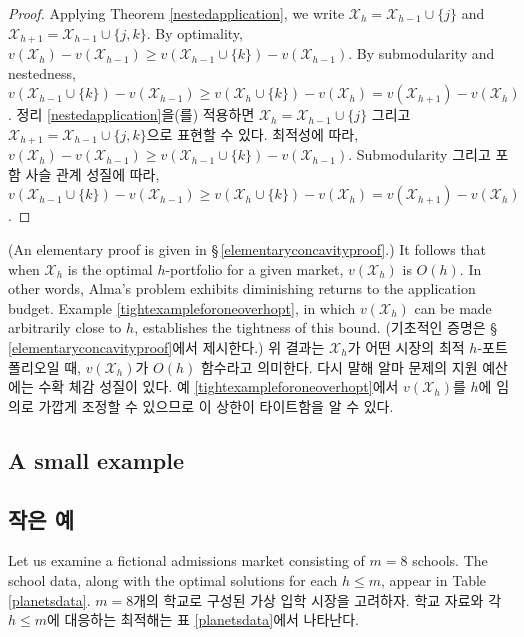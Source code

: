 \documentclass[11pt]{article} %
\theoremstyle{definition}
\newtheorem{example}{Example}
\theoremstyle{definition}
\newtheorem{example}{예}
\begin{document}
\begin{proof}
\ifen Applying Theorem \ref{nestedapplication}, we write $\mathcal{X}_h = \mathcal{X}_{h-1} \cup\{j\}$ and $\mathcal{X}_{h+1} = \mathcal{X}_{h-1} \cup\{j, k\}$. By optimality, $v(\mathcal{X}_h) - v(\mathcal{X}_{h-1}) \geq v(\mathcal{X}_{h-1}\cup\{k\}) - v(\mathcal{X}_{h-1})$. By submodularity and nestedness, $v(\mathcal{X}_{h-1}\cup\{k\}) - v(\mathcal{X}_{h-1}) \geq  v(\mathcal{X}_{h}\cup\{k\}) - v(\mathcal{X}_{h}) = v(\mathcal{X}_{h+1}) - v(\mathcal{X}_{h})$.
\else 정리 \ref{nestedapplication}을(를) 적용하면 $ \mathcal{X}_h = \mathcal{X}_{h-1} \cup\{j\}$ 그리고 $\mathcal{X}_{h+1} = \mathcal{X}_{h-1} \cup\{j, k\}$으로 표현할 수 있다. 최적성에 따라, $v(\mathcal{X}_h) - v(\mathcal{X}_{h-1}) \geq v(\mathcal{X}_{h-1}\cup\{k\}) - v(\mathcal{X}_{h-1})$. Submodularity 그리고 포함 사슬 관계 성질에 따라, $v(\mathcal{X}_{h-1}\cup\{k\}) - v(\mathcal{X}_{h-1}) \geq  v(\mathcal{X}_{h}\cup\{k\}) - v(\mathcal{X}_{h}) = v(\mathcal{X}_{h+1}) - v(\mathcal{X}_{h})$. \fi
\end{proof}
\ifen
\noindent (An elementary proof is given in \S\,\ref{elementaryconcavityproof}.) It follows that when $\mathcal{X}_h$ is the optimal $h$-portfolio for a given market, $v(\mathcal{X}_h)$ is $O(h)$. In other words, Alma's problem exhibits diminishing returns to the application budget. Example \ref{tightexampleforoneoverhopt}, in which $v(\mathcal{X}_h)$ can be made arbitrarily close to $h$, establishes the tightness of this bound.
\else
\noindent (기초적인 증명은 \S\,\ref{elementaryconcavityproof}에서 제시한다.) 위 결과는 $\mathcal{X}_h$가 어떤 시장의 최적 $h$-포트폴리오일 때, $v(\mathcal{X}_h)$가 $O(h)$ 함수라고 의미한다. 다시 말해 알마 문제의 지원 예산에는 수확 체감 성질이 있다. 예 \ref{tightexampleforoneoverhopt}에서 $v(\mathcal{X}_h)$를 $h$에 임의로 가깝게 조정할 수 있으므로 이 상한이 타이트함을 알 수 있다.
\fi


\ifen \subsection{A small example} \else \subsection{작은 예} \fi \label{planetsexamplesection}
\ifen 
Let us examine a fictional admissions market consisting of $m=8$ schools. The school data, along with the optimal solutions for each $h \leq m$, appear in Table \ref{planetsdata}.
\else 
$m = 8$개의 학교로 구성된 가상 입학 시장을 고려하자. 학교 자료와 각 $h \leq m$에 대응하는 최적해는 표 \ref{planetsdata}에서 나타난다.
\fi
\end{document}
